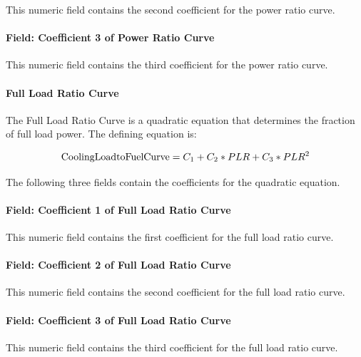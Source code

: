 This numeric field contains the second coefficient for the power ratio curve.

\paragraph{Field: Coefficient 3 of Power Ratio Curve}\label{field-coefficient-3-of-power-ratio-curve-1}

This numeric field contains the third coefficient for the power ratio curve.

\paragraph{Full Load Ratio Curve}\label{full-load-ratio-curve-1}

The Full Load Ratio Curve is a quadratic equation that determines the fraction of full load power. The defining equation is:

\begin{equation}
{\rm{CoolingLoadtoFuelCurve}} = {C_1} + {C_2} * PLR + {C_3} * PL{R^2}
\end{equation}

The following three fields contain the coefficients for the quadratic equation.

\paragraph{Field: Coefficient 1 of Full Load Ratio Curve}\label{field-coefficient-1-of-full-load-ratio-curve-1}

This numeric field contains the first coefficient for the full load ratio curve.

\paragraph{Field: Coefficient 2 of Full Load Ratio Curve}\label{field-coefficient-2-of-full-load-ratio-curve-1}

This numeric field contains the second coefficient for the full load ratio curve.

\paragraph{Field: Coefficient 3 of Full Load Ratio Curve}\label{field-coefficient-3-of-full-load-ratio-curve-1}

This numeric field contains the third coefficient for the full load ratio curve.

